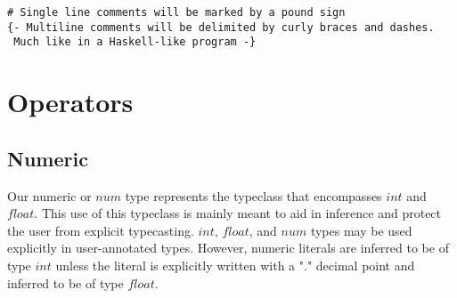 ﻿\documentclass[5pt]{article}
\begin{document}
\noindent \texttt{\# Single line comments will be marked by a pound sign} \\

\noindent \texttt{\{- Multiline comments will be delimited by curly braces and dashes. } \\
\texttt{ \hspace*{3mm} Much like in a Haskell-like program -\}} \\

\newpage 

\section{Operators}
\subsection{Numeric}
Our numeric or $num$ type represents the typeclass that encompasses $int$ and
$float$. This use of this typeclass is mainly meant to aid in inference and
protect the user from explicit typecasting. $int$, $float$, and $num$ types may
be used explicitly in user-annotated types. However, numeric literals are
inferred to be of type $int$ unless the literal is explicitly written with a "."
decimal point and inferred to be of type $float$.
\end{document}
